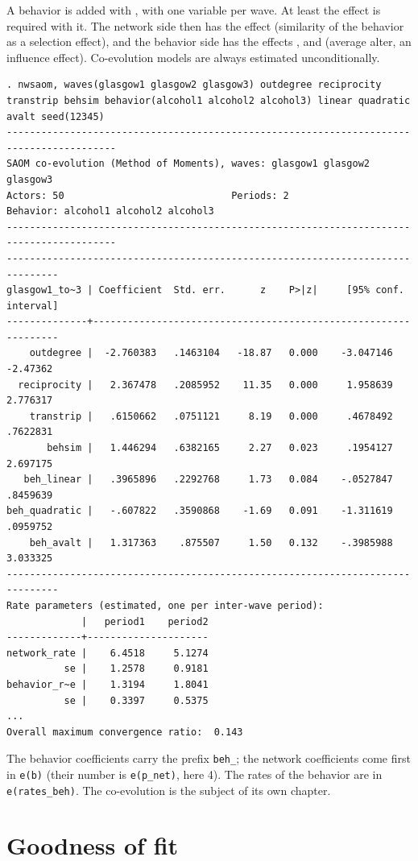 A behavior is added with , with one variable per wave. At least the effect  is required with it. The network side then has the effect  (similarity of the behavior as a selection effect), and the behavior side has the effects ,  and  (average alter, an influence effect). Co-evolution models are always estimated unconditionally.
\begin{lstlisting}
. nwsaom, waves(glasgow1 glasgow2 glasgow3) outdegree reciprocity transtrip behsim behavior(alcohol1 alcohol2 alcohol3) linear quadratic avalt seed(12345)
-----------------------------------------------------------------------------------------
SAOM co-evolution (Method of Moments), waves: glasgow1 glasgow2 glasgow3
Actors: 50                             Periods: 2
Behavior: alcohol1 alcohol2 alcohol3
-----------------------------------------------------------------------------------------
-------------------------------------------------------------------------------
glasgow1_to~3 | Coefficient  Std. err.      z    P>|z|     [95% conf. interval]
--------------+----------------------------------------------------------------
    outdegree |  -2.760383   .1463104   -18.87   0.000    -3.047146    -2.47362
  reciprocity |   2.367478   .2085952    11.35   0.000     1.958639    2.776317
    transtrip |   .6150662   .0751121     8.19   0.000     .4678492    .7622831
       behsim |   1.446294   .6382165     2.27   0.023     .1954127    2.697175
   beh_linear |   .3965896   .2292768     1.73   0.084    -.0527847    .8459639
beh_quadratic |   -.607822   .3590868    -1.69   0.091    -1.311619    .0959752
    beh_avalt |   1.317363    .875507     1.50   0.132    -.3985988    3.033325
-------------------------------------------------------------------------------
Rate parameters (estimated, one per inter-wave period):
             |   period1    period2
-------------+---------------------
network_rate |    6.4518     5.1274
          se |    1.2578     0.9181
behavior_r~e |    1.3194     1.8041
          se |    0.3397     0.5375
...
Overall maximum convergence ratio:  0.143
\end{lstlisting}
The behavior coefficients carry the prefix \texttt{beh\_}; the network coefficients come first in \texttt{e(b)} (their number is \texttt{e(p\_net)}, here 4). The rates of the behavior are in \texttt{e(rates\_beh)}. The co-evolution is the subject of its own chapter.

\section{Goodness of fit}

